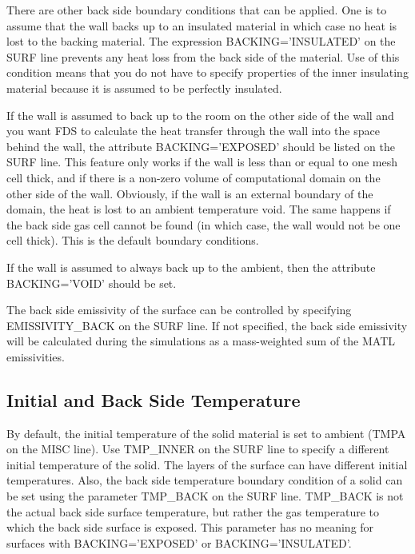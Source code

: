 \documentclass[11pt]{book}
\begin{document}
There are other back side boundary conditions that can be applied. One is to assume that the wall
backs up to an insulated material in which case no heat is lost to
the backing material. The expression {\ct BACKING='INSULATED'} on
the {\ct SURF} line prevents any heat loss from the back side of the material. Use of this condition
means that you  do not have to specify properties of the inner insulating material because it is assumed to
be perfectly insulated.

If the wall is assumed to back up to the room on the other side of
the wall and you want FDS to calculate the heat transfer
through the wall into the space behind the wall, the attribute
{\ct BACKING='EXPOSED'} should be listed on the {\ct SURF} line. This feature only works
if the wall is less than or equal to one mesh cell thick, and if there is a non-zero volume
of computational domain on the other side of the wall. Obviously, if
the wall is an external boundary of the domain, the heat is lost to an ambient temperature void. The same happens if the back side
gas cell cannot be found (in which case, the wall would not be one cell thick).  This is the default boundary conditions.

If the wall is assumed to always back up to the ambient, then the attribute {\ct BACKING='VOID'} should be set.

The back side emissivity of the surface can be controlled by specifying {\ct EMISSIVITY\_BACK} on the {\ct SURF} line. If not specified, the back side
emissivity will be calculated during the simulations as a mass-weighted sum of the {\ct MATL} emissivities.

\subsection{Initial and Back Side Temperature}
\label{info:TMP_INNER}

By default, the initial temperature of the solid material is set to
ambient ({\ct TMPA} on the {\ct MISC} line). Use {\ct TMP\_INNER} on the {\ct SURF} line to
specify a different initial temperature of the solid. The layers of the surface can have different initial temperatures.
Also, the back side temperature boundary condition of a solid can be
set using the parameter {\ct TMP\_BACK} on the {\ct SURF}
line. {\ct TMP\_BACK} is not the actual back side surface temperature,
but rather the gas temperature to which the back side surface is exposed. This
parameter has no meaning for surfaces with {\ct BACKING='EXPOSED'} or
{\ct BACKING='INSULATED'}.
\end{document}
